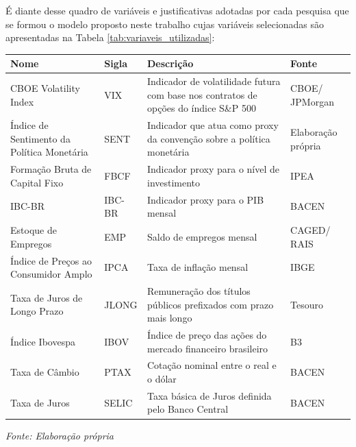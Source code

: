 É diante desse quadro de variáveis e justificativas adotadas por cada pesquisa que se formou o modelo proposto neste trabalho cujas variáveis selecionadas são apresentadas na Tabela \ref{tab:variaveis_utilizadas}:

\bigskip %
\noindent
\begin{minipage}{\textwidth}
\centering
{} %
\small %
\begin{tabularx}{0.7374\textwidth}{ %
>{\centering\arraybackslash}m{2.1cm}
>{\centering\arraybackslash}m{1.5cm}
>{\centering\arraybackslash}m{5cm}
>{\centering\arraybackslash}m{1.5cm}
}
\hline
\rowcolor{gray!20}
\textbf{Nome} & \textbf{Sigla} & \textbf{Descrição} & \textbf{Fonte} \\ \hline
CBOE Volatility Index & VIX & Indicador de volatilidade futura com base nos contratos de opções do índice S\&P 500 & CBOE/ JPMorgan \\ \hline
Índice de Sentimento da Política Monetária & SENT & Indicador que atua como proxy da convenção sobre a política monetária & Elaboração própria \\ \hline
Formação Bruta de Capital Fixo & FBCF & Indicador proxy para o nível de investimento & IPEA \\ \hline
IBC-BR & IBC-BR & Indicador proxy para o PIB mensal & BACEN \\ \hline
Estoque de Empregos & EMP & Saldo de empregos mensal & CAGED/ RAIS \\ \hline
Índice de Preços ao Consumidor Amplo & IPCA & Taxa de inflação mensal & IBGE \\ \hline
Taxa de Juros de Longo Prazo & JLONG & Remuneração dos títulos públicos prefixados com prazo mais longo & Tesouro \\ \hline
Índice Ibovespa & IBOV & Índice de preço das ações do mercado financeiro brasileiro & B3 \\ \hline
Taxa de Câmbio & PTAX & Cotação nominal entre o real e o dólar & BACEN \\ \hline
Taxa de Juros & SELIC & Taxa básica de Juros definida pelo Banco Central & BACEN \\ \hline
\end{tabularx}
\label{tab:variaveis_utilizadas} %
\end{minipage}
\vspace{-0.1cm}
\par\noindent
    \begin{minipage}{\textwidth}
        \centering
        \footnotesize %
        \textit{Fonte: Elaboração própria}
    \end{minipage}
\bigskip %


